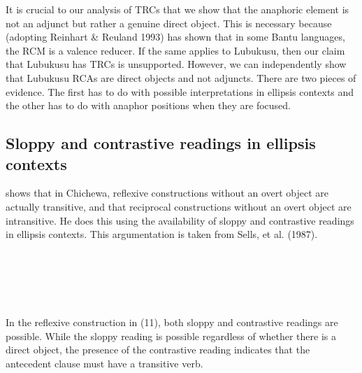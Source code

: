 \documentclass[output=paper]{langsci/langscibook}
\begin{document}
  It is crucial to our analysis of TRCs that we show that the anaphoric element is not an adjunct but rather a genuine direct object. This is necessary because \citet{Mchombo1994} (adopting Reinhart \& Reuland 1993) has shown that in some Bantu languages, the RCM is a valence reducer. If the same applies to Lubukusu, then our claim that Lubukusu has TRCs is unsupported. However, we can independently show that Lubukusu RCAs are direct objects and not adjuncts. There are two pieces of evidence. The first has to do with possible interpretations in ellipsis contexts and the other has to do with anaphor positions when they are focused.

\subsection{Sloppy and contrastive readings in ellipsis contexts}

  \citet[106]{Mchombo2004} shows that in Chichewa, reflexive constructions without an overt object are actually transitive, and that reciprocal constructions without an overt object are intransitive. He does this using the availability of sloppy and contrastive readings in ellipsis contexts. This argumentation is taken from Sells, et al. (1987).

\setcounter{listWWviiiNumxlileveli}{0}
\begin{listWWviiiNumxlileveli}
\item \ea\label{ex:}
\\
\ea\label{ex:}
\\
\ea\label{ex:}
\\
\ea\label{ex:}
\\
\end{listWWviiiNumxlileveli}

In the reflexive construction in (11), both sloppy and contrastive readings are possible. While the sloppy reading is possible regardless of whether there is a direct object, the presence of the contrastive reading indicates that the antecedent clause must have a transitive verb. 
\end{document}
